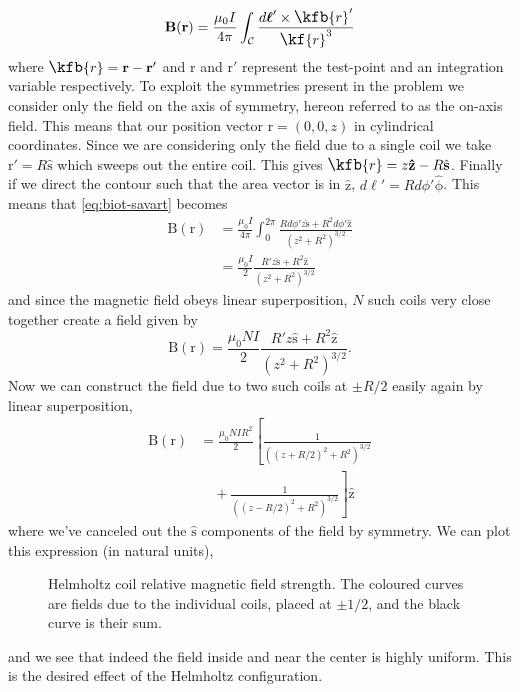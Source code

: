 \documentclass[10pt, twocolumn]{article}
\theoremstyle{definition}
\newcommand{\bv}[1]{\bm{\mathrm{#1}}}
\newcommand{\uz}{\bv{\hat{z}}}
\newcommand{\uv}[1]{\hat{\bv{{#1}}}}
\newcommand{\scriptr}{\fontsize{12pt}{12pt}\kf{r}\fontsize{10pt}{10pt}}
\newcommand{\bscriptr}{\fontsize{12pt}{12pt}\kfb{r}\fontsize{10pt}{10pt}}
\begin{document}
\begin{equation}
\bv{B}(\bv{r})=\frac{\mu_0 I}{4\pi}\int_\mathcal{C}\frac{d\bv{\ell}'\times \bscriptr'}{\scriptr^3}
    \label{eq:biot-savart}
\end{equation}
where $\bscriptr=\bv{r}-\bv{r}'$ and $\bv{r}$ and $\bv{r}'$ represent the test-point and an integration variable respectively.
To exploit the symmetries present in the problem we consider only the field on the axis of symmetry, hereon referred to as the on-axis field. This means that our position vector $\bv{r}=(0,0,z)$ in cylindrical coordinates. Since we are considering only the field due to a single coil we take $\bv{r}'=R\uv{s}$ which sweeps out the entire coil. This gives $\bscriptr=z\uz-R\uv{s}$. Finally if we direct the contour such that the area vector is in $\uz$, $d\ell'=Rd\phi'\uv{\phi}$. This means that \cref{eq:biot-savart} becomes 
\begin{align*}
    \bv{B}(\bv{r})&=\frac{\mu_0 I}{4\pi}\int_0^{2\pi}\frac{Rd\phi'z\uv{s}+R^2d\phi'\uz}{(z^2+R^2)^{3/2}}\\
    &=\frac{\mu_0 I}{2}\frac{R'z\uv{s}+R^2\uz}{(z^2+R^2)^{3/2}}
\end{align*}
and since the magnetic field obeys linear superposition, $N$ such coils very close together create a field given by 
\begin{equation}
\bv{B}(\bv{r})=\frac{\mu_0 NI}{2}\frac{R'z\uv{s}+R^2\uz}{(z^2+R^2)^{3/2}}.
    \label{eq:nfield}
\end{equation}
Now we can construct the field due to two such coils at $\pm R/2$ easily again by linear superposition,
\begin{align}
\bv{B}(\bv{r})&=\frac{\mu_0 NIR^2}{2}\left[\frac{1}{((z+R/2)^2+R^2)^{3/2}}\right.\nonumber\\
&\quad+\left.\frac{1}{((z-R/2)^2+R^2)^{3/2}}\right]\uz
    \label{eq:helmholtz-field}
\end{align}
where we've canceled out the $\uv{s}$ components of the field by symmetry.
  We can plot this expression (in natural units),
\begin{figure}[h]
  \centering
    \caption{Helmholtz coil relative magnetic field strength. The coloured curves are fields due to the individual coils, placed at $\pm 1/2$, and the black curve is their sum.}
\end{figure}
and we see that indeed the field inside and near the center is highly uniform. This is the desired effect of the Helmholtz configuration.
\end{document}
